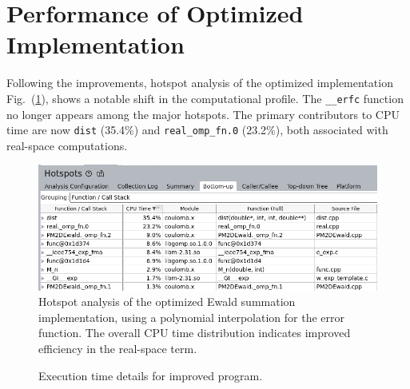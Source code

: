 \section{Performance of Optimized Implementation}
Following the improvements, hotspot analysis of the optimized implementation Fig.~(\ref{fig:resultVTuneFinal}), shows a notable shift in the computational profile. The \texttt{\_\_erfc} function no longer appears among the major hotspots. The primary contributors to CPU time are now \texttt{dist} (35.4\%) and \texttt{real\_omp\_fn.0} (23.2\%), both associated with real-space computations. 
\begin{figure}[htbp]
    \centering
    \includegraphics[width = \linewidth]{images/VTuneFinalHotSpots.png}
    \caption{Hotspot analysis of the optimized Ewald summation implementation, using a polynomial interpolation for the error function. The overall CPU time distribution indicates improved efficiency in the real-space term.}
    \label{fig:resultVTuneFinal}
\end{figure}
\begin{figure}[htbp]
    \centering
    \begin{minipage}{0.7\textwidth}
    \end{minipage}%
    \begin{minipage}{0.3\textwidth}
        \caption{Execution time details for improved program.}
    \end{minipage}
\end{figure}

